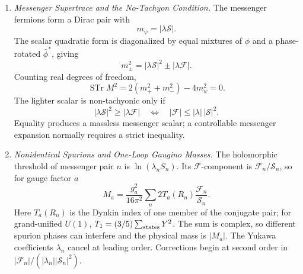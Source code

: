 \begin{enumerate}
  \begin{enumerate}
    \item \emph{Messenger Supertrace and the No-Tachyon Condition.}
    The messenger fermions form a Dirac pair with
      \[
        m_\psi=|\lambda\mathcal S|.
      \]
      The scalar quadratic form is diagonalized by equal mixtures of
      \(\phi\) and a phase-rotated \(\bar\phi^*\), giving
      \[
        m_\pm^2=|\lambda\mathcal S|^2
          \pm|\lambda\mathcal F|.
      \]
      Counting real degrees of freedom,
      \[
        \operatorname{STr}M^2
          =2(m_+^2+m_-^2)-4m_\psi^2=0.
      \]
      The lighter scalar is non-tachyonic only if
      \[
        |\lambda\mathcal S|^2\geq|\lambda\mathcal F|
        \quad\Longleftrightarrow\quad
        |\mathcal F|\leq|\lambda|\,|\mathcal S|^2.
      \]
      Equality produces a massless messenger scalar; a controllable
      messenger expansion normally requires a strict inequality.
    \item \emph{Nonidentical Spurions and One-Loop Gaugino Masses.}
    The holomorphic threshold of messenger pair \(n\) is
      \(\ln(\lambda_nS_n)\).  Its \(\mathcal F\)-component is
      \(\mathcal F_n/\mathcal S_n\), so for gauge factor \(a\)
      \[
        M_a=\frac{g_a^2}{16\pi^2}
          \sum_n2T_a(R_n)\frac{\mathcal F_n}{\mathcal S_n}.
      \]
      Here \(T_a(R_n)\) is the Dynkin index of one member of the conjugate
      pair; for grand-unified \(U(1)\),
      \(T_1=(3/5)\sum_{\rm states}Y^2\).
      The sum is complex, so different spurion phases can interfere and the
      physical mass is \(|M_a|\).  The Yukawa coefficients \(\lambda_n\)
      cancel at leading order.  Corrections begin at second order in
      \(|\mathcal F_n|/(|\lambda_n||\mathcal S_n|^2)\).
  \end{enumerate}


\end{enumerate}
